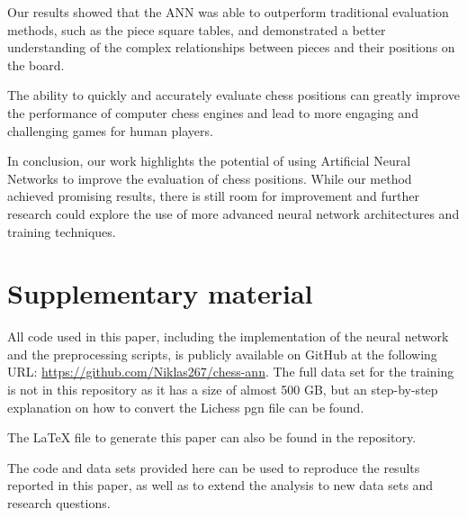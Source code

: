 \documentclass[conference]{IEEEtran}
\begin{document}
Our results showed that the ANN was able to outperform traditional evaluation methods, such as the piece square tables, and demonstrated a better understanding of the complex relationships between pieces and their positions on the board.

The ability to quickly and accurately evaluate chess positions can greatly improve the performance of computer chess engines and lead to more engaging and challenging games for human players.

In conclusion, our work highlights the potential of using Artificial Neural Networks to improve the evaluation of chess positions. While our method achieved promising results, there is still room for improvement and further research could explore the use of more advanced neural network architectures and training techniques. 

\section{Supplementary material}\label{supplementary material}

All code used in this paper, including the implementation of the neural network and the preprocessing scripts, is publicly available on GitHub at the following URL: \url{https://github.com/Niklas267/chess-ann}.
The full data set for the training is not in this repository as it has a size of almost 500 GB, but an step-by-step explanation on how to convert the Lichess pgn file can be found. 

The LaTeX file to generate this paper can also be found in the repository.

The code and data sets provided here can be used to reproduce the results reported in this paper, as well as to extend the analysis to new data sets and research questions.
\end{document}
